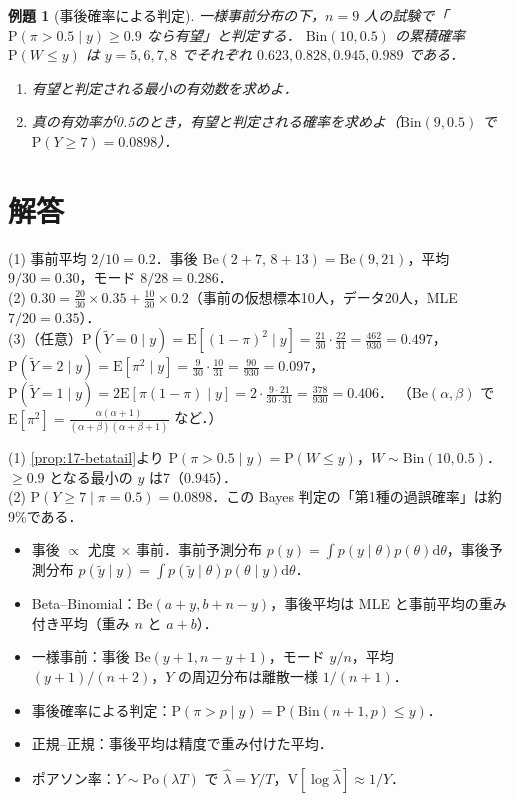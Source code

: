 \documentclass[a4paper,11pt,openany]{ltjsbook}
\newtheorem{reidai}{例題}[chapter]
\newenvironment{kaitou}[1]{%
  \par\medskip\noindent
  \begin{tcolorbox}[enhanced,breakable,colback=bkgray!3,colframe=bkgray!60,boxrule=0.4pt,
    left=4pt,right=4pt,top=2pt,bottom=2pt,arc=1pt,
    title={\cref{#1}の解答},fonttitle=\bfseries\small,coltitle=white,colbacktitle=bkgray!80]}%
  {\end{tcolorbox}\par}
\newcommand{\E}{\mathrm{E}}
\newcommand{\V}{\mathrm{V}}
\newcommand{\Prob}{\mathrm{P}}
\newcommand{\dd}{\mathrm{d}}
\newcommand{\Bin}{\mathrm{Bin}}
\newcommand{\Po}{\mathrm{Po}}
\newcommand{\Be}{\mathrm{Be}}
\begin{document}
\begin{reidai}[事後確率による判定]\label{reidai:17-2}
一様事前分布の下，$n=9$ 人の試験で「$\Prob(\pi>0.5\mid y)\ge0.9$ なら有望」と判定する．
$\Bin(10,0.5)$ の累積確率 $\Prob(W\le y)$ は $y=5,6,7,8$ でそれぞれ $0.623,0.828,0.945,0.989$ である．
\begin{enumerate}[label=(\arabic*)]
\item 有望と判定される最小の有効数を求めよ．
\item 真の有効率が0.5のとき，有望と判定される確率を求めよ（$\Bin(9,0.5)$ で $\Prob(Y\ge7)=0.0898$）．
\end{enumerate}
\end{reidai}

\section{解答}\label{sec:17-sol}
\begin{kaitou}{reidai:17-1}
(1) 事前平均 $2/10=0.2$．事後 $\Be(2+7,\,8+13)=\Be(9,21)$，平均 $9/30=0.30$，モード $8/28=0.286$．\\
(2) $0.30=\frac{20}{30}\times0.35+\frac{10}{30}\times0.2$（事前の仮想標本10人，データ20人，MLE $7/20=0.35$）．\\
(3)（任意）$\Prob(\tilde Y=0\mid y)=\E[(1-\pi)^2\mid y]=\frac{21}{30}\cdot\frac{22}{31}=\frac{462}{930}=0.497$，
$\Prob(\tilde Y=2\mid y)=\E[\pi^2\mid y]=\frac{9}{30}\cdot\frac{10}{31}=\frac{90}{930}=0.097$，
$\Prob(\tilde Y=1\mid y)=2\E[\pi(1-\pi)\mid y]=2\cdot\frac{9\cdot21}{30\cdot31}=\frac{378}{930}=0.406$．
（$\Be(\alpha,\beta)$ で $\E[\pi^2]=\frac{\alpha(\alpha+1)}{(\alpha+\beta)(\alpha+\beta+1)}$ など．）
\end{kaitou}

\begin{kaitou}{reidai:17-2}
(1) \cref{prop:17-betatail}より $\Prob(\pi>0.5\mid y)=\Prob(W\le y)$，$W\sim\Bin(10,0.5)$．$\ge0.9$ となる最小の $y$ は7（$0.945$）．\\
(2) $\Prob(Y\ge7\mid\pi=0.5)=0.0898$．この Bayes 判定の「第1種の過誤確率」は約9\%である．
\end{kaitou}

\begin{summarybox}
\begin{itemize}
\item 事後 $\propto$ 尤度 $\times$ 事前．事前予測分布 $p(y)=\int p(y\mid\theta)p(\theta)\dd\theta$，事後予測分布 $p(\tilde y\mid y)=\int p(\tilde y\mid\theta)p(\theta\mid y)\dd\theta$．
\item Beta--Binomial：$\Be(a+y,b+n-y)$，事後平均は MLE と事前平均の重み付き平均（重み $n$ と $a+b$）．
\item 一様事前：事後 $\Be(y+1,n-y+1)$，モード $y/n$，平均 $(y+1)/(n+2)$，$Y$ の周辺分布は離散一様 $1/(n+1)$．
\item 事後確率による判定：$\Prob(\pi>p\mid y)=\Prob(\Bin(n+1,p)\le y)$．
\item 正規--正規：事後平均は精度で重み付けた平均．
\item ポアソン率：$Y\sim\Po(\lambda T)$ で $\hat\lambda=Y/T$，$\V[\log\hat\lambda]\approx1/Y$．
\end{itemize}
\end{summarybox}
\end{document}
